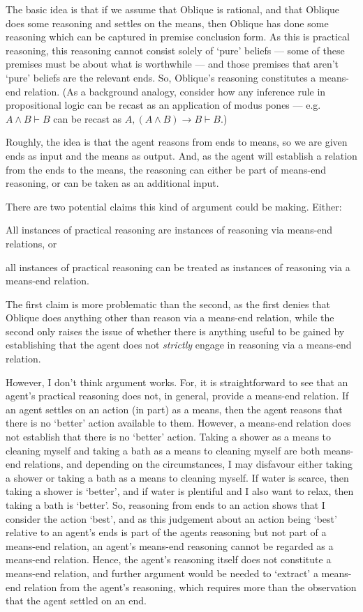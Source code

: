 \documentclass[10pt]{article}
\begin{document}
The basic idea is that if we assume that Oblique is rational, and that Oblique does some reasoning and settles on the means, then Oblique has done some reasoning which can be captured in premise conclusion form.
As this is practical reasoning, this reasoning cannot consist solely of `pure' beliefs --- some of these premises must be about what is worthwhile --- and those premises that aren't `pure' beliefs are the relevant ends.
So, Oblique's reasoning constitutes a means-end relation.
(As a background analogy, consider how any inference rule in propositional logic can be recast as an application of modus pones --- e.g.\ \(A \land B \vdash B\) can be recast as \(A, (A \land B) \rightarrow B \vdash B\).)

Roughly, the idea is that the agent reasons from ends to means, so we are given ends as input and the means as output.
And, as the agent will establish a relation from the ends to the means, the reasoning can either be part of means-end reasoning, or can be taken as an additional input.

There are two potential claims this kind of argument could be making.
Either:
\begin{enumerate*}[label=\alph*)]
\item All instances of practical reasoning are instances of reasoning via means-end relations, or
\item all instances of practical reasoning can be treated as instances of reasoning via a means-end relation.
\end{enumerate*}
The first claim is more problematic than the second, as the first denies that Oblique does anything other than reason via a means-end relation, while the second only raises the issue of whether there is anything useful to be gained by establishing that the agent does not \emph{strictly} engage in reasoning via a means-end relation.

However, I don't think argument works.
For, it is straightforward to see that an agent's practical reasoning does not, in general, provide a means-end relation.
If an agent settles on an action (in part) as a means, then the agent reasons that there is no `better' action available to them.
However, a means-end relation does not establish that there is no `better' action.
Taking a shower as a means to cleaning myself and taking a bath as a means to cleaning myself are both means-end relations, and depending on the circumstances, I may disfavour either taking a shower or taking a bath as a means to cleaning myself.
If water is scarce, then taking a shower is `better', and if water is plentiful and I also want to relax, then taking a bath is `better'.
So, reasoning from ends to an action shows that I consider the action `best', and as this judgement about an action being `best' relative to an agent's ends is part of the agents reasoning but not part of a means-end relation, an agent's means-end reasoning cannot be regarded as a means-end relation.
Hence, the agent's reasoning itself does not constitute a means-end relation, and further argument would be needed to `extract' a means-end relation from the agent's reasoning, which requires more than the observation that the agent settled on an end.
\end{document}
